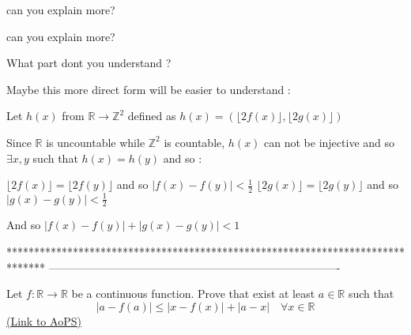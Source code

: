 \begin{solution}
	can you explain more?
\end{solution}



\begin{solution}
	\begin{tcolorbox}can you explain more?\end{tcolorbox}
What part dont you understand ?

Maybe this more direct form will be easier to understand :

Let $h(x)$ from $\mathbb R\to\mathbb Z^2$ defined as $h(x)=(\lfloor 2f(x)\rfloor,\lfloor 2g(x)\rfloor)$

Since $\mathbb R$ is uncountable while $\mathbb Z^2$ is countable, $h(x)$ can not be injective and so $\exists x,y$ such that $h(x)=h(y)$ and so :

$\lfloor 2f(x)\rfloor=\lfloor 2f(y)\rfloor$ and so $|f(x)-f(y)|<\frac 12$
$\lfloor 2g(x)\rfloor=\lfloor 2g(y)\rfloor$ and so $|g(x)-g(y)|<\frac 12$

And so $|f(x)-f(y)|+|g(x)-g(y)|<1$
\end{solution}
*******************************************************************************
-------------------------------------------------------------------------------

\begin{problem}
	Let $f:\mathbb{R}\to \mathbb{R}$ be a continuous function. Prove that exist at least $a\in \mathbb{R}$ such that 
\[\left| {a - f\left( a \right)} \right| \le \left| {x - f\left( x \right)} \right| + \left| {a - x} \right| \quad \forall x\in \mathbb{R}\]
	\flushright \href{https://artofproblemsolving.com/community/c6h568380}{(Link to AoPS)}
\end{problem}



